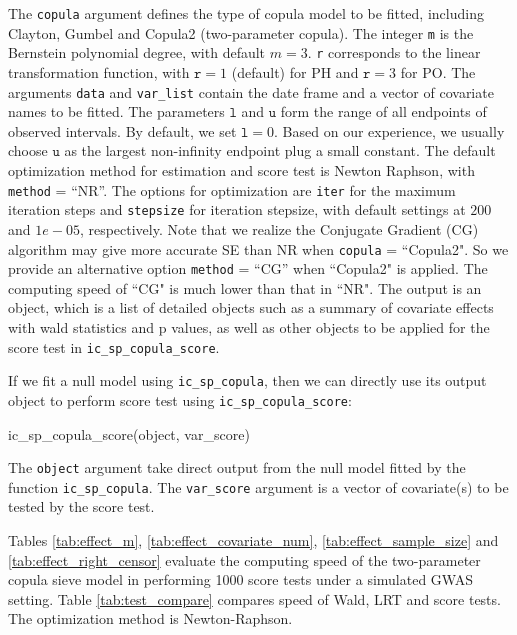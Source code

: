 The \texttt{copula} argument defines the type of copula model to be fitted, including Clayton, Gumbel and Copula2 (two-parameter copula). The integer \texttt{m} is the Bernstein polynomial degree, with default $m=3$. \texttt{r} corresponds to the linear transformation function, with $\texttt{r} = 1$ (default) for PH and $\texttt{r} = 3$ for PO. The arguments \texttt{data} and \texttt{var\_list} contain the date frame and a vector of covariate names to be fitted. The parameters $\texttt{l}$ and $\texttt{u}$ form the range of all endpoints of observed intervals. By default, we set $\texttt{l} = 0$. Based on our experience, we usually choose $\texttt{u}$ as the largest non-infinity endpoint plug a small constant. The default optimization method for estimation and score test is Newton Raphson, with \texttt{method} = ``NR''.  The options for optimization are \texttt{iter} for the maximum iteration steps and \texttt{stepsize} for iteration stepsize, with default settings at $200$ and $1e-05$, respectively. Note that we realize the Conjugate Gradient (CG) algorithm may give more accurate SE than NR when \texttt{copula} = ``Copula2". So we provide an alternative option \texttt{method} = ``CG'' when ``Copula2" is applied. The computing speed of ``CG" is much lower than that in ``NR". The output is an object, which is a list of detailed objects such as a summary of covariate effects with wald statistics and p values, as well as other objects to be applied for the score test in \texttt{ic\_sp\_copula\_score}.

If we fit a null model using \texttt{ic\_sp\_copula}, then we can directly use its output object to perform score test using \texttt{ic\_sp\_copula\_score}:

\begin{example}
  ic_sp_copula_score(object, var_score)
\end{example}

The \texttt{object} argument take direct output from the null model fitted by the function \texttt{ic\_sp\_copula}. The \texttt{var\_score} argument is a vector of covariate(s) to be tested by the score test.

Tables \ref{tab:effect_m}, \ref{tab:effect_covariate_num}, \ref{tab:effect_sample_size} and \ref{tab:effect_right_censor} evaluate the computing speed of the two-parameter copula sieve model in performing 1000 score tests under a simulated GWAS setting. Table \ref{tab:test_compare} compares speed of Wald, LRT and score tests. The optimization method is Newton-Raphson.

